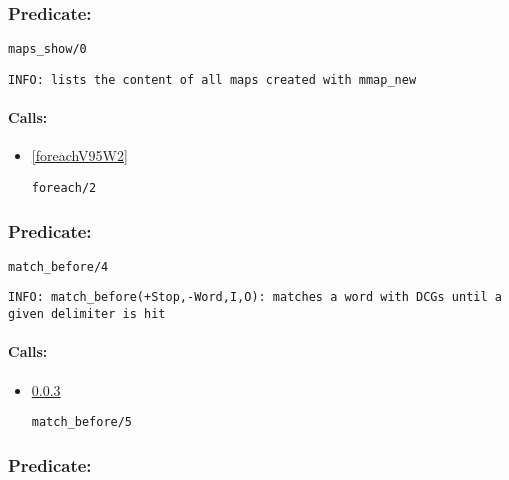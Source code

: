 \subsubsection{Predicate:} \label{mapsV95WshowV95W0}

\begin{verbatim}
maps_show/0
\end{verbatim}

{\small \begin{verbatim}
INFO: lists the content of all maps created with mmap_new

\end{verbatim}}
\paragraph{Calls:} 
\begin{itemize}
\item \ref{foreachV95W2} 
\begin{verbatim}
foreach/2
\end{verbatim}

\end{itemize}

\subsubsection{Predicate:} \label{matchV95WbeforeV95W4}

\begin{verbatim}
match_before/4
\end{verbatim}

{\small \begin{verbatim}
INFO: match_before(+Stop,-Word,I,O): matches a word with DCGs until a given delimiter is hit

\end{verbatim}}
\paragraph{Calls:} 
\begin{itemize}
\item \ref{matchV95WbeforeV95W5} 
\begin{verbatim}
match_before/5
\end{verbatim}

\end{itemize}

\subsubsection{Predicate:} \label{matchV95WbeforeV95W5}

